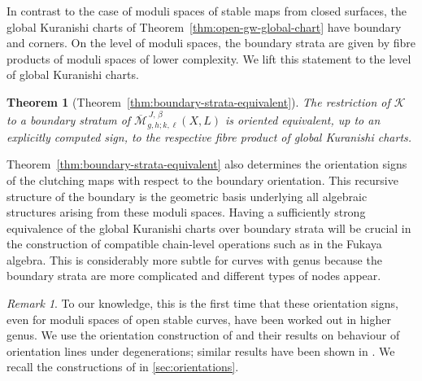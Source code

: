 \documentclass[11pt,psamsfonts, oneside, reqno]{amsart}
\newcommand{\Mbar}{\overline{\mathcal M}}
\newcommand{\cK}{\mathcal{K}}
\newtheorem{intthm}{Theorem}
\theoremstyle{definition}
\theoremstyle{remark}
\newtheorem{remark}[theorem]{Remark}
\numberwithin{equation}{section}
\begin{document}
In contrast to the case of moduli spaces of stable maps from closed surfaces, the global Kuranishi charts of Theorem~\ref{thm:open-gw-global-chart} have boundary and corners. On the level of moduli spaces, the boundary strata are given by fibre products of moduli spaces of lower complexity. We lift this statement to the level of global Kuranishi charts.

\begin{intthm}[Theorem~\ref{thm:boundary-strata-equivalent}]\label{int:boundary} The restriction of $\cK$ to a boundary stratum of $\Mbar_{g,h;k,\ell}^{\,J,\,\beta}(X,L)$ is oriented equivalent, up to an explicitly computed sign, to the respective fibre product of global Kuranishi charts.
\end{intthm}

\noindent
 Theorem~\ref{thm:boundary-strata-equivalent} also determines the orientation signs of the clutching maps with respect to the boundary orientation. This recursive structure of the boundary is the geometric basis underlying all algebraic structures arising from these moduli spaces. Having a sufficiently strong equivalence of the global Kuranishi charts over boundary strata will be crucial in the construction of compatible chain-level operations such as in the Fukaya algebra. This is considerably more subtle for curves with genus because the boundary strata are more complicated and different types of nodes appear.

\begin{remark}\label{}
	To our knowledge, this is the first time that these orientation signs, even for moduli spaces of open stable curves, have been worked out in higher genus. We use the orientation construction of \cite{CZ24} and their results on behaviour of orientation lines under degenerations; similar results have been shown in \cite{WW17,FOOO16}. We recall the constructions of \cite{CZ24} in \textsection\ref{sec:orientations}. 
\end{remark}
\end{document}
